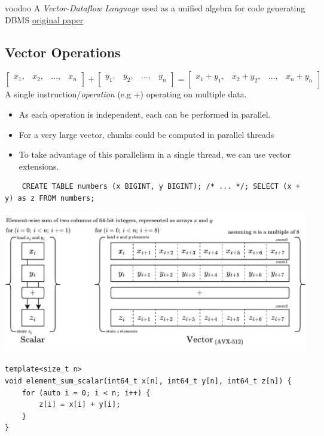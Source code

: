 \begin{definitionbox}{voodoo}
    A \textit{Vector-Dataflow Language} used as a unified algebra for code generating DBMS
    \href{https://www.cs.albany.edu/~jhh/courses/readings/pirk.pvldb16.pdf}{original paper}
\end{definitionbox}

\subsection{Vector Operations}
\[\begin{bmatrix}
    x_1, & x_2, & \dots, & x_n \\
\end{bmatrix} + \begin{bmatrix}
    y_1, & y_2, & \dots, & y_n \\
\end{bmatrix} = \begin{bmatrix}
    x_1 + y_1, & x_2 + y_2, & \dots, & x_n + y_n \\
\end{bmatrix}\]
A single instruction/\textit{operation} (e.g $+$) operating on multiple data.
\begin{itemize}
    \item As each operation is independent, each can be performed in parallel.
    \item For a very large vector, chunks could be computed in parallel threads
    \item To take advantage of this parallelism in a single thread, we can use vector extensions.  
\end{itemize}
\begin{verbatim}
    CREATE TABLE numbers (x BIGINT, y BIGINT); /* ... */; SELECT (x + y) as z FROM numbers;
    \end{verbatim}
\begin{center}
    \includegraphics[width=\textwidth]{advanced_topics/images/vector_arithmetic.drawio.png}
\end{center}
\begin{verbatim}
template<size_t n>
void element_sum_scalar(int64_t x[n], int64_t y[n], int64_t z[n]) {
    for (auto i = 0; i < n; i++) {
        z[i] = x[i] + y[i];
    }
}
\end{verbatim}

